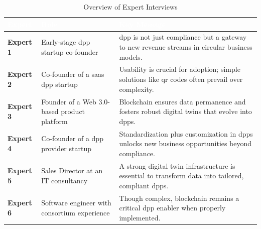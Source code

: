 \begin{table}[H]
    \setlength{\intextsep}{0pt}
    \centering
    \small
    \caption{Overview of Expert Interviews}
    \renewcommand\tabularxcolumn[1]{m{#1}}
    \renewcommand{\arraystretch}{1.1}
    \begin{tabularx}{\linewidth}{|>{\columncolor{myGrey}\centering\arraybackslash}m{3cm}|
                                   >{\centering\arraybackslash}m{3.5cm}|
                                   >{\raggedright\arraybackslash}X|}
        \hline
        \rowcolor{myDarkBlue}
        \textcolor{white}{\textbf{Expert}} & 
        \textcolor{white}{\textbf{Role}} & 
        \textcolor{white}{\textbf{Key Message}} \\
        \hline
        
        \cellcolor{myGrey}\centering \textbf{Expert 1} & 
        Early-stage \ac{dpp} startup co-founder & 
        \ac{dpp} is not just compliance but a gateway to new revenue streams in circular business models. \\
        \hline

        \cellcolor{myGrey}\centering \textbf{Expert 2} & 
        Co-founder of a \acrshort{saas} \ac{dpp} startup & 
        Usability is crucial for adoption; simple solutions like \ac{qr} codes often prevail over complexity. \\
        \hline

        \cellcolor{myGrey}\centering \textbf{Expert 3} & 
        Founder of a Web 3.0-based product platform & 
        Blockchain ensures data permanence and fosters robust digital twins that evolve into \ac{dpp}s. \\
        \hline

        \cellcolor{myGrey}\centering \textbf{Expert 4} & 
        Co-founder of a \ac{dpp} provider startup & 
        Standardization plus customization in \ac{dpp}s unlocks new business opportunities beyond compliance. \\
        \hline

        \cellcolor{myGrey}\centering \textbf{Expert 5} & 
        Sales Director at an IT consultancy & 
        A strong digital twin infrastructure is essential to transform data into tailored, compliant \ac{dpp}s. \\
        \hline

        \cellcolor{myGrey}\centering \textbf{Expert 6} & 
        Software engineer with consortium experience & 
        Though complex, blockchain remains a critical \ac{dpp} enabler when properly implemented. \\
        \hline
    \end{tabularx}
    \label{tab:experts_overview}
\end{table}

